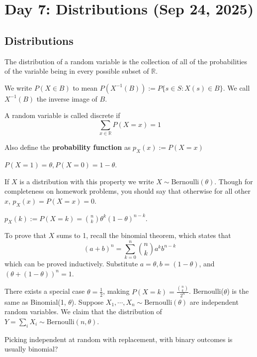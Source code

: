 \section{Day 7: Distributions (Sep 24, 2025)}

\subsection{Distributions}

\begin{definition}[Distribution]
The distribution of a random variable is the collection of all of the probabilities of the variable being in every possible subset of $\mathbb{R}$.
\end{definition}

We write $P(X \in B)$ to mean $P(X^{-1}(B)) := P \{ s \in S: X(s) \in B \}$. We call $X^{-1}(B)$ the inverse image of $B$. 

\begin{definition}
A random variable is called discrete if
\[
    \sum_{x \in \mathbb{R}} P(X = x) = 1
\]
\end{definition}

\noindent Also define the \textbf{probability function} as $p_X(x) := P(X = x)$

\begin{definition}
    $P(X = 1) = \theta, P(X = 0) = 1 - \theta$.
\end{definition}
If $X$ is a distribution with this property we write $X \sim \text{Bernoulli}(\theta)$. Though for completeness on homework problems, you should say that otherwise for all other $x$, $p_X(x) = P(X = x) = 0$.

\begin{definition}
    $p_X(k) := P(X = k) = \binom{n}{k} \theta^k (1 - \theta)^{n-k}$.
\end{definition}

To prove that $X$ sums to 1, recall the binomial theorem, which states that
\[
(a + b)^n = \sum_{k = 0}^n \binom{n}{k} a^kb^{n-k} 
\]
which can be proved inductively. Substitute $a = \theta, b = (1 - \theta)$, and $(\theta + (1 - \theta))^n = 1$.

There exists a special case $\theta = \frac{1}{2}$, making $P(X = k) = \frac{\binom{n}{k}}{2^{n}}$. Bernoulli($\theta$) is the same as Binomial(1, $\theta$). Suppose $X_1, \cdots, X_n \sim \text{Bernoulli}(\theta)$ are independent random variables. We claim that the distribution of $Y = \sum_i X_i \sim \text{Bernoulli}(n, \theta)$.

Picking independent at random with replacement, with binary outcomes is usually binomial?
